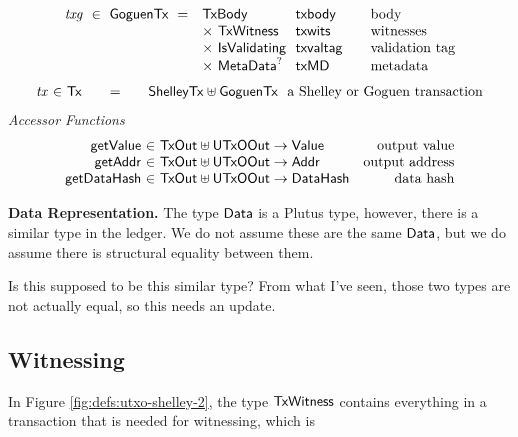 \begin{figure*}[htb]
\begin{equation*}
\begin{array}{r@{~~}l@{~~}l@{\qquad}l}
      \var{txg} ~\in~ \GoguenTx ~=~
      & \TxBody & \fun{txbody} & \text{body}\\
      & \times ~\TxWitness & \fun{txwits} & \text{witnesses}\\
      & \times ~\IsValidating & \fun{txvaltag}&\text{validation tag}\\
      & \times ~\MetaData^? & \fun{txMD}&\text{metadata}\\
    \end{array}
  \end{equation*}
  \begin{equation*}
    \begin{array}{r@{~\in~}l@{\qquad=\qquad}lr}
      \var{tx} & \Tx & \ShelleyTx \uniondistinct \GoguenTx
      \text{~~a Shelley or Goguen transaction}\\
    \end{array}
  \end{equation*}
  \emph{Accessor Functions}
  \begin{equation*}
    \begin{array}{r@{~\in~}lr}
      \fun{getValue} & \TxOut \uniondistinct \UTxOOut \to \Value & \text{output value} \\
      \fun{getAddr} & \TxOut \uniondistinct \UTxOOut \to \Addr & \text{output address} \\
      \fun{getDataHash} & \TxOut \uniondistinct \UTxOOut \to \DataHash & \text{data hash}
    \end{array}
  \end{equation*}
  \caption{Definitions for transactions, cont.}
  \label{fig:defs:utxo-shelley-2}
\end{figure*}


\textbf{Data Representation.}
The type $\mathsf{Data}$ is a Plutus type, however, there is a similar type in the
ledger. We do not assume these are the same $\mathsf{Data}$, but we do assume there
is structural equality between them.
\begin{note}
  Is this supposed to be this similar type? From what I've seen, those
  two types are not actually equal, so this needs an update.
\end{note}

\subsection{Witnessing}
In Figure \ref{fig:defs:utxo-shelley-2}, the type $\mathsf{TxWitness}$ contains everything
in a transaction that is needed for witnessing, which is

